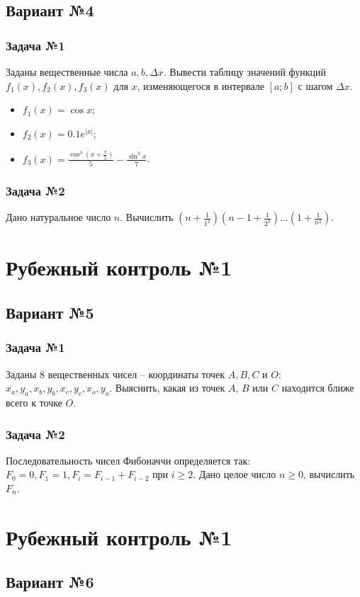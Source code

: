 \documentclass[12pt,a5paper,landscape]{article}
\begin{document}
\subsection*{Вариант №4}
\subsubsection*{Задача №1}
Заданы вещественные числа $a, b, \Delta x$. Вывести таблицу значений функций $f_1(x), f_2(x), f_3(x)$ для $x$, изменяющегося в интервале $[a;b]$ с шагом $\Delta x$.
\begin{itemize}
\item $f_1(x) = \cos{x}$;
\item $f_2(x) = 0.1e^{|x|}$;
\item $f_3(x) = \frac{\cos^3{(x+\frac{\pi}{2})}}{5} - \frac{\sin^3{x}}{7} $.
\end{itemize}
\subsubsection*{Задача №2}
Дано натуральное число $n$. Вычислить $(n + \frac{1}{1^2})(n-1 + \frac{1}{2^2}) \ldots (1 + \frac{1}{n^2})$.


\clearpage
\section*{Рубежный контроль №1}
\subsection*{Вариант №5}
\subsubsection*{Задача №1}
Заданы 8 вещественных чисел -- координаты точек $A, B, C$ и $O$: $x_a, y_a, x_b, y_b, x_c, y_c, x_o, y_o$. Выяснить, какая из точек $A$, $B$ или $C$ находится ближе всего к точке $O$.
\subsubsection*{Задача №2}
Последовательность чисел Фибоначчи определяется так: $F_0 = 0, F_1 = 1, F_i = F_{i-1} + F_{i-2}$ при $i \ge 2$. Дано целое число $n \ge 0$, вычислить $F_n$.


\clearpage
\section*{Рубежный контроль №1}
\subsection*{Вариант №6}
\end{document}

